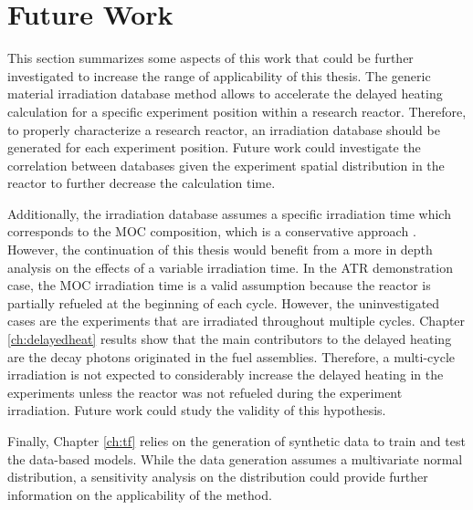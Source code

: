 \section{Future Work}

This section summarizes some aspects of this work that could be further investigated to increase the range of applicability of this thesis.
The generic material irradiation database method allows to accelerate the delayed heating calculation for a specific experiment position within a research reactor.
Therefore, to properly characterize a research reactor, an irradiation database should be generated for each experiment position.
Future work could investigate the correlation between databases given the experiment spatial distribution in the reactor to further decrease the calculation time.

Additionally, the irradiation database assumes a specific irradiation time which corresponds to the \gls*{MOC} composition, which is a conservative approach \cite{ilas_impact_2013}.
However, the continuation of this thesis would benefit from a more in depth analysis on the effects of a variable irradiation time.
In the ATR demonstration case, the MOC irradiation time is a valid assumption because the reactor is partially refueled at the beginning of each cycle.
However, the uninvestigated cases are the experiments that are irradiated throughout multiple cycles.
Chapter \ref{ch:delayedheat} results show that the main contributors to the delayed heating are the decay photons originated in  the fuel assemblies.
Therefore, a multi-cycle irradiation is not expected to considerably increase the delayed heating in the experiments unless the reactor was not refueled during the experiment irradiation.
Future work could study the validity of this hypothesis.

Finally, Chapter \ref{ch:tf} relies on the generation of synthetic data to train and test the data-based models.
While the data generation assumes a multivariate normal distribution, a sensitivity analysis on the distribution could provide further information on the applicability of the method.
